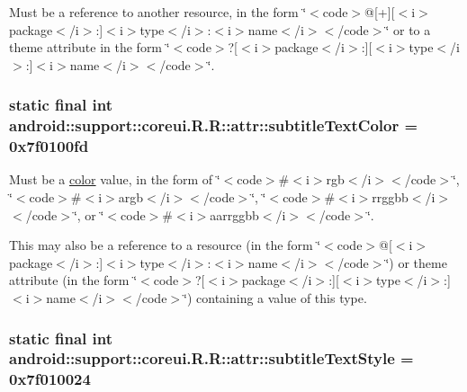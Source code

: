 Must be a reference to another resource, in the form \char`\"{}$<$code$>$@\mbox{[}+\mbox{]}\mbox{[}$<$i$>$package$<$/i$>$:\mbox{]}$<$i$>$type$<$/i$>$:$<$i$>$name$<$/i$>$$<$/code$>$\char`\"{} or to a theme attribute in the form \char`\"{}$<$code$>$?\mbox{[}$<$i$>$package$<$/i$>$:\mbox{]}\mbox{[}$<$i$>$type$<$/i$>$:\mbox{]}$<$i$>$name$<$/i$>$$<$/code$>$\char`\"{}. \hypertarget{classandroid_1_1support_1_1coreui_1_1_r_1_1attr_835f12fe69a89ba5ba8c994e4b2f6479}{
\subsubsection[{subtitleTextColor}]{\setlength{\rightskip}{0pt plus 5cm}static final int android::support::coreui.R.R::attr::subtitleTextColor = 0x7f0100fd}}
\label{classandroid_1_1support_1_1coreui_1_1_r_1_1attr_835f12fe69a89ba5ba8c994e4b2f6479}


Must be a \hyperlink{classandroid_1_1support_1_1coreui_1_1_r_1_1color}{color} value, in the form of \char`\"{}$<$code$>$\#$<$i$>$rgb$<$/i$>$$<$/code$>$\char`\"{}, \char`\"{}$<$code$>$\#$<$i$>$argb$<$/i$>$$<$/code$>$\char`\"{}, \char`\"{}$<$code$>$\#$<$i$>$rrggbb$<$/i$>$$<$/code$>$\char`\"{}, or \char`\"{}$<$code$>$\#$<$i$>$aarrggbb$<$/i$>$$<$/code$>$\char`\"{}. 

This may also be a reference to a resource (in the form \char`\"{}$<$code$>$@\mbox{[}$<$i$>$package$<$/i$>$:\mbox{]}$<$i$>$type$<$/i$>$:$<$i$>$name$<$/i$>$$<$/code$>$\char`\"{}) or theme attribute (in the form \char`\"{}$<$code$>$?\mbox{[}$<$i$>$package$<$/i$>$:\mbox{]}\mbox{[}$<$i$>$type$<$/i$>$:\mbox{]}$<$i$>$name$<$/i$>$$<$/code$>$\char`\"{}) containing a value of this type. \hypertarget{classandroid_1_1support_1_1coreui_1_1_r_1_1attr_81746c1679cc1c7f2cc4be3f153b03c8}{
\subsubsection[{subtitleTextStyle}]{\setlength{\rightskip}{0pt plus 5cm}static final int android::support::coreui.R.R::attr::subtitleTextStyle = 0x7f010024}}
\label{classandroid_1_1support_1_1coreui_1_1_r_1_1attr_81746c1679cc1c7f2cc4be3f153b03c8}


